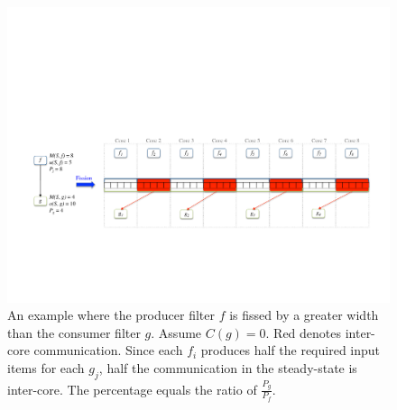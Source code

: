 \documentclass[]{article}
\begin{document}
\begin{figure}
\centering
\includegraphics[width=\textwidth]{diff-widths.pdf}
\caption[Example of fission where producer fissed more than
consumer.]{An example where the producer filter $f$ is fissed by a
  greater width than the consumer filter $g$.  Assume $C(g) = 0$.  Red
  denotes inter-core communication.  Since each $f_i$ produces half
  the required input items for each $g_j$, half the communication in
  the steady-state is inter-core.  The percentage equals the ratio of
  $\frac{P_g}{P_f}$. \label{fig:diff-widths}}
\vspace{10pt}
\end{figure}
\end{document}
